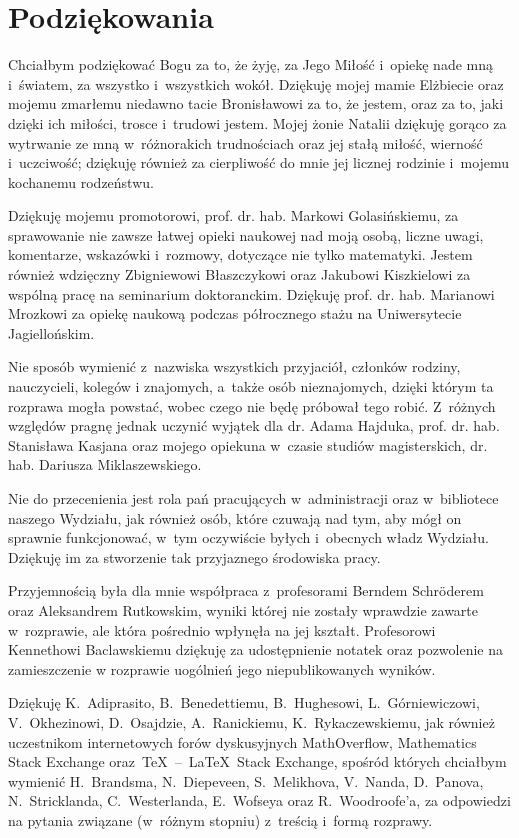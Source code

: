 \chapter{Podziękowania}

Chciałbym podziękować Bogu za to, że żyję, za Jego Miłość i~opiekę nade mną i~światem, za wszystko i~wszystkich wokół. Dziękuję mojej mamie Elżbiecie oraz mojemu zmarłemu niedawno tacie Bronisławowi za to, że jestem, oraz za to, jaki dzięki ich miłości, trosce i~trudowi jestem. Mojej żonie Natalii dziękuję gorąco za wytrwanie ze mną w~różnorakich trudnościach oraz jej stałą miłość, wierność i~uczciwość; dziękuję również za cierpliwość do mnie jej licznej rodzinie i~mojemu kochanemu rodzeństwu.

Dziękuję mojemu promotorowi, prof. dr. hab. Markowi Golasińskiemu, za sprawowanie nie zawsze łatwej opieki naukowej nad moją osobą, liczne uwagi, komentarze, wskazówki i~rozmowy, dotyczące nie tylko matematyki. Jestem również wdzięczny Zbigniewowi Błaszczykowi oraz Jakubowi Kiszkielowi za wspólną pracę na seminarium doktoranckim. Dziękuję prof. dr. hab. Marianowi Mrozkowi za opiekę naukową podczas półrocznego stażu na Uniwersytecie Jagiellońskim.

Nie sposób wymienić z~nazwiska wszystkich przyjaciół, członków rodziny, nauczycieli, kolegów i znajomych, a~także osób nieznajomych, dzięki którym ta rozprawa mogła powstać, wobec czego nie będę próbował tego robić. Z~różnych względów pragnę jednak uczynić wyjątek dla dr. Adama Hajduka, prof. dr. hab. Stanisława Kasjana oraz mojego opiekuna w~czasie studiów magisterskich, dr. hab. Dariusza Miklaszewskiego.

Nie do przecenienia jest rola pań pracujących w~administracji oraz w~bibliotece naszego Wydziału, jak również osób, które czuwają nad tym, aby mógł on sprawnie funkcjonować, w~tym oczywiście byłych i~obecnych władz Wydziału. Dziękuję im za stworzenie tak przyjaznego środowiska pracy.

Przyjemnością była dla mnie współpraca z~profesorami Berndem Schr{\"o}derem oraz Aleksandrem Rutkowskim, wyniki której nie zostały wprawdzie zawarte w~rozprawie, ale która pośrednio wpłynęła na jej kształt. Profesorowi Kennethowi Baclawskiemu dziękuję za udostępnienie notatek \cite{Baclawski} oraz pozwolenie na zamieszczenie w rozprawie uogólnień jego niepublikowanych wyników.

Dziękuję K.~Adiprasito, B.~Benedettiemu, B.~Hughesowi, L.~Górniewiczowi, V.~Okhezinowi, D.~Osajdzie, A.~Ranickiemu, K.~Rykaczewskiemu, jak również uczestnikom internetowych forów dyskusyjnych MathOverflow, Mathematics Stack Exchange oraz~\TeX~--~\LaTeX~Stack Exchange, spośród których chciałbym wymienić  H.~Brandsma, N.~Diepeveen, S.~Melikhova, V.~Nanda, D.~Panova, N.~Stricklanda, C.~Westerlanda, E.~Wofseya oraz R.~Woodroofe'a, za odpowiedzi na pytania związane (w~różnym stopniu) z~treścią i~formą rozprawy.

